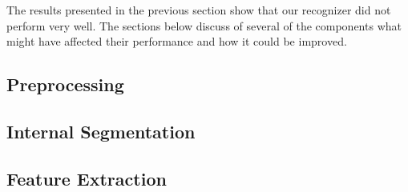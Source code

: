 The results presented in the previous section show that our recognizer did not perform very well. The sections below discuss of several of the components what might have affected their performance and how it could be improved.

\subsection{Preprocessing}
\label{ss:discussion:preprocessing}


\subsection{Internal Segmentation}
\label{ss:discussion:characterSegmentation}


\subsection{Feature Extraction}
\label{ss:discussion:featureExtraction}

